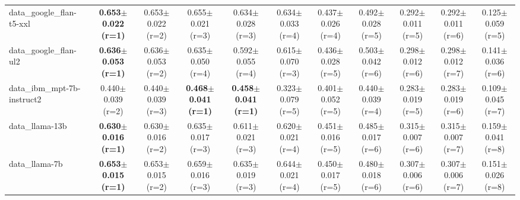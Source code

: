 \begin{table}[t]
\begin{tabular}{lcccccccccc}
data\_google\_flan-t5-xxl & \cellcolor{red!15}\textbf{0.653$\pm$0.022 {\scriptsize (r=1)}} & 0.653$\pm$0.022 {\scriptsize (r=2)} & 0.655$\pm$0.021 {\scriptsize (r=3)} & 0.634$\pm$0.028 {\scriptsize (r=3)} & 0.634$\pm$0.033 {\scriptsize (r=4)} & 0.437$\pm$0.026 {\scriptsize (r=4)} & 0.492$\pm$0.028 {\scriptsize (r=5)} & 0.292$\pm$0.011 {\scriptsize (r=5)} & 0.292$\pm$0.011 {\scriptsize (r=6)} & 0.125$\pm$0.059 {\scriptsize (r=5)} \\
data\_google\_flan-ul2 & \cellcolor{red!15}\textbf{0.636$\pm$0.053 {\scriptsize (r=1)}} & 0.636$\pm$0.053 {\scriptsize (r=2)} & 0.635$\pm$0.050 {\scriptsize (r=4)} & 0.592$\pm$0.055 {\scriptsize (r=4)} & 0.615$\pm$0.070 {\scriptsize (r=3)} & 0.436$\pm$0.028 {\scriptsize (r=5)} & 0.503$\pm$0.042 {\scriptsize (r=6)} & 0.298$\pm$0.012 {\scriptsize (r=6)} & 0.298$\pm$0.012 {\scriptsize (r=7)} & 0.141$\pm$0.036 {\scriptsize (r=6)} \\
data\_ibm\_mpt-7b-instruct2 & 0.440$\pm$0.039 {\scriptsize (r=2)} & 0.440$\pm$0.039 {\scriptsize (r=3)} & \cellcolor{red!15}\textbf{0.468$\pm$0.041 {\scriptsize (r=1)}} & \cellcolor{red!15}\textbf{0.458$\pm$0.041 {\scriptsize (r=1)}} & 0.323$\pm$0.079 {\scriptsize (r=5)} & 0.401$\pm$0.052 {\scriptsize (r=5)} & 0.440$\pm$0.039 {\scriptsize (r=4)} & 0.283$\pm$0.019 {\scriptsize (r=5)} & 0.283$\pm$0.019 {\scriptsize (r=6)} & 0.109$\pm$0.045 {\scriptsize (r=7)} \\
data\_llama-13b & \cellcolor{red!15}\textbf{0.630$\pm$0.016 {\scriptsize (r=1)}} & 0.630$\pm$0.016 {\scriptsize (r=2)} & 0.635$\pm$0.017 {\scriptsize (r=3)} & 0.611$\pm$0.021 {\scriptsize (r=3)} & 0.620$\pm$0.021 {\scriptsize (r=4)} & 0.451$\pm$0.016 {\scriptsize (r=5)} & 0.485$\pm$0.017 {\scriptsize (r=6)} & 0.315$\pm$0.007 {\scriptsize (r=6)} & 0.315$\pm$0.007 {\scriptsize (r=7)} & 0.159$\pm$0.041 {\scriptsize (r=8)} \\
data\_llama-7b & \cellcolor{red!15}\textbf{0.653$\pm$0.015 {\scriptsize (r=1)}} & 0.653$\pm$0.015 {\scriptsize (r=2)} & 0.659$\pm$0.016 {\scriptsize (r=3)} & 0.635$\pm$0.019 {\scriptsize (r=3)} & 0.644$\pm$0.021 {\scriptsize (r=4)} & 0.450$\pm$0.017 {\scriptsize (r=5)} & 0.480$\pm$0.018 {\scriptsize (r=6)} & 0.307$\pm$0.006 {\scriptsize (r=6)} & 0.307$\pm$0.006 {\scriptsize (r=7)} & 0.151$\pm$0.026 {\scriptsize (r=8)} \\
\bottomrule
\end{tabular}
\end{table}